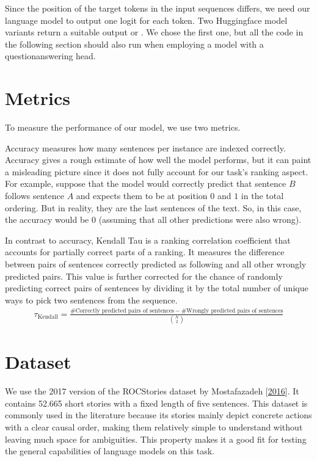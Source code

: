 \documentclass[letterpaper,10pt,english]{jupyterBook}
\begin{document}
\sphinxAtStartPar
Since the position of the target tokens in the input sequences differs, we need our language model to output one logit for each token. Two Huggingface model variants return a suitable output  or . We chose the first one, but all the code in the following section should also run when employing a model with a question\sphinxhyphen{}answering head.


\section{Metrics}
\label{\detokenize{Experiment:metrics}}
\sphinxAtStartPar
To measure the performance of our model, we use two metrics.

\sphinxAtStartPar
{}

\sphinxAtStartPar
Accuracy measures how many sentences per instance are indexed correctly.
Accuracy gives a rough estimate of how well the model performs, but it can paint a misleading picture since it does not fully account for our task’s ranking aspect.
For example, suppose that the model would correctly predict that sentence \(B\) follows sentence \(A\) and expects them to be at position \(0\) and \(1\) in the total ordering.
But in reality, they are the last sentences of the text. So, in this case, the accuracy would be \(0\) (assuming that all other predictions were also wrong).

\sphinxAtStartPar
{}

\sphinxAtStartPar
In contrast to accuracy, Kendall Tau is a ranking correlation coefficient that accounts for partially correct parts of a ranking.
It measures the difference between pairs of sentences correctly predicted as following and all other wrongly predicted pairs.
This value is further corrected for the chance of randomly predicting correct pairs of sentences by dividing it by the total number of unique ways to pick two sentences from the sequence.
\begin{equation*}
\begin{split}
\tau_{\textrm{Kendall}} = \frac{\#\textrm{Correctly predicted pairs of sentences} - \#\textrm{Wrongly predicted pairs of sentences}}{\binom{N}{2}}
\end{split}
\end{equation*}

\section{Dataset}
\label{\detokenize{Experiment:dataset}}
\sphinxAtStartPar
We use the 2017 version of the ROCStories dataset by Mostafazadeh  {[}\hyperlink{cite.Bibliography:id2}{2016}{]}. It contains 52.665 short stories with a fixed length of five sentences. This dataset is commonly used in the literature because its stories mainly depict concrete actions with a clear causal order, making them relatively simple to understand without leaving much space for ambiguities. This property makes it a good fit for testing the general capabilities of language models on this task.
\end{document}

